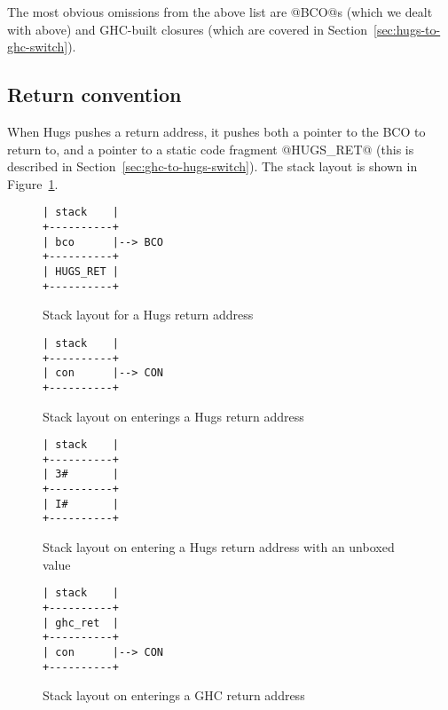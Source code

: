 \documentclass[11pt]{article}
\newcommand{\secref}[1]{Section~\ref{sec:#1}}
\newcommand{\figref}[1]{Figure~\ref{fig:#1}}
\newcommand{\Subsection}[2]{\subsection{#1}\label{sec:#2}}
\begin{document}
The most obvious omissions from the above list are @BCO@s (which we
dealt with above) and GHC-built closures (which are covered in
\secref{hugs-to-ghc-switch}).


\Subsection{Return convention}{hugs-return-convention}

When Hugs pushes a return address, it pushes both a pointer to the BCO
to return to, and a pointer to a static code fragment @HUGS_RET@ (this
is described in \secref{ghc-to-hugs-switch}).  The
stack layout is shown in \figref{hugs-return-stack}.

\begin{figure}[ht]
\begin{center}
\begin{verbatim}
| stack    |
+----------+
| bco      |--> BCO
+----------+
| HUGS_RET |
+----------+
\end{verbatim}
%
\end{center}
\caption{Stack layout for a Hugs return address}
\label{fig:hugs-return-stack}
\end{figure}

\begin{figure}[ht]
\begin{center}
\begin{verbatim}
| stack    |
+----------+
| con      |--> CON
+----------+
\end{verbatim}
%
\end{center}
\caption{Stack layout on enterings a Hugs return address}
\label{fig:hugs-return2}
\end{figure}

\begin{figure}[ht]
\begin{center}
\begin{verbatim}
| stack    |
+----------+
| 3#       |
+----------+
| I#       |
+----------+
\end{verbatim}
%
\end{center}
\caption{Stack layout on entering a Hugs return address with an unboxed value}
\label{fig:hugs-return-int1}
\end{figure}

\begin{figure}[ht]
\begin{center}
\begin{verbatim}
| stack    |
+----------+
| ghc_ret  |
+----------+
| con      |--> CON
+----------+
\end{verbatim}
%
\end{center}
\caption{Stack layout on enterings a GHC return address}
\label{fig:hugs-return3}
\end{figure}
\end{document}
